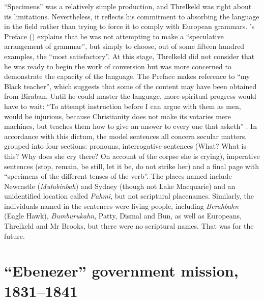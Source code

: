 {“Specimens” was a relatively simple production, and Threlkeld was right about its limitations. Nevertheless, it reflects his commitment to absorbing the language in the field rather than trying to force it to comply with European grammars. \citeauthor{threlkeld_specimens_1827}’s Preface (\citeyear[iii]{threlkeld_specimens_1827}) explains that he was not attempting to make a “speculative arrangement of grammar”, but simply to choose, out of some fifteen hundred examples, the “most satisfactory”. At this stage, Threlkeld did not consider that he was ready to begin the work of conversion but was more concerned to demonstrate the capacity of the language. The Preface makes reference to “my Black teacher”, which suggests that some of the content may have been obtained from Biraban. Until he could master the language, more spiritual progress would have to wait: “To attempt instruction before I can argue with them as men, would be injurious, because Christianity does not make its votaries mere machines, but teaches them how to give an answer to every one that asketh” \citep[iv]{threlkeld_specimens_1827}. In accordance with this dictum, the model sentences all concern secular matters, grouped into four sections: pronouns, interrogative sentences (What? What is this? Why does she cry there? On account of the corpse she is crying), imperative sentences (stop, remain, be still, let it be, do not strike her) and a final page with “specimens of the different tenses of the verb”. The places named include Newcastle (\textit{Mulubinbah}) and Sydney (though not Lake Macquarie) and an unidentified location called \textit{Pahmi}, but not scriptural placenames. Similarly, the individuals named in the sentences were living people, including \textit{Berahbahn} (Eagle Hawk), \textit{Bumburukahn}, Patty, Dismal and Bun, as well as Europeans, Threlkeld and Mr Brooks, but there were no scriptural names. That was for the future.

\section{“Ebenezer” government mission, 1831--1841}

}
